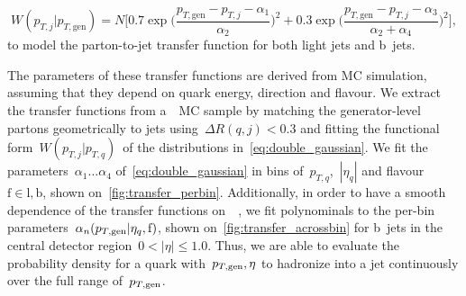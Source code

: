 \begin{equation}
\label{eq:double_gaussian}
W(p_{T,j} | p_{T,\mathrm{gen}}) = N \biggl[0.7\exp{\biggl(\frac{p_{T,\mathrm{gen}} - p_{T,j} - \alpha_1}{\alpha_2}\biggr)^2} + 0.3\exp{\biggl(\frac{p_{T,\mathrm{gen}} - p_{T,j} - \alpha_3}{\alpha_2+\alpha_4}\biggr)^2}\biggr],
\end{equation}
to model the parton-to-jet transfer function for both light jets and b~jets.

The parameters of these transfer functions are derived from MC simulation, assuming that they depend on quark energy, direction and flavour. We extract the transfer functions from a~\ttbar~MC sample by matching the generator-level partons geometrically to jets using~$\Delta R(q,j) < 0.3$ and fitting the functional form~$W(p_{T,j}|p_{T,q})$~of the distributions in~\cref{eq:double_gaussian}. We fit the parameters~$\alpha_1 \dots \alpha_4$ of~\cref{eq:double_gaussian} in bins of~$p_{T,q}$,~$|\eta_{q}|$ and flavour~$\mathrm{f}\in{\mathrm{l}, \mathrm{b}}$, shown on~\cref{fig:transfer_perbin}. Additionally, in order to have a smooth dependence of the transfer functions on~\ptgen~, we fit polynominals to the per-bin parameters~$\alpha_n(p_{T,\mathrm{gen}}|\eta_{q},\mathrm{f})$, shown on~\cref{fig:transfer_acrossbin} for b~jets in the central detector region~$0 < |\eta| \le 1.0$. Thus, we are able to evaluate the probability density for a quark with~$p_{T,\mathrm{gen}},\eta$ to hadronize into a jet continuously over the full range of~$p_{T,\mathrm{gen}}$.

